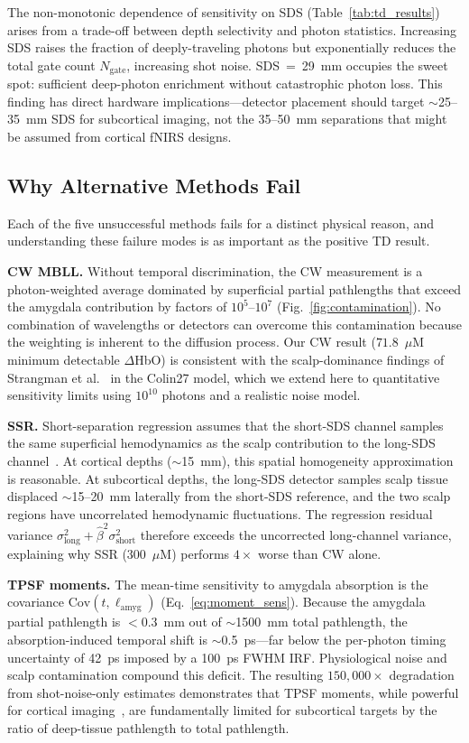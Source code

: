 \documentclass[11pt,a4paper]{article}
\begin{document}
The non-monotonic dependence of sensitivity on SDS (Table~\ref{tab:td_results}) arises from a trade-off between depth selectivity and photon statistics. Increasing SDS raises the fraction of deeply-traveling photons but exponentially reduces the total gate count $N_\mathrm{gate}$, increasing shot noise. SDS~=~29~mm occupies the sweet spot: sufficient deep-photon enrichment without catastrophic photon loss. This finding has direct hardware implications---detector placement should target $\sim$25--35~mm SDS for subcortical imaging, not the 35--50~mm separations that might be assumed from cortical fNIRS designs.

\subsection{Why Alternative Methods Fail}

Each of the five unsuccessful methods fails for a distinct physical reason, and understanding these failure modes is as important as the positive TD result.

\textbf{CW MBLL.} Without temporal discrimination, the CW measurement is a photon-weighted average dominated by superficial partial pathlengths that exceed the amygdala contribution by factors of $10^5$--$10^7$ (Fig.~\ref{fig:contamination}). No combination of wavelengths or detectors can overcome this contamination because the weighting is inherent to the diffusion process. Our CW result ($71.8$~$\mu$M minimum detectable $\Delta$HbO) is consistent with the scalp-dominance findings of Strangman et al.~\cite{strangman2014review} in the Colin27 model, which we extend here to quantitative sensitivity limits using $10^{10}$ photons and a realistic noise model.

\textbf{SSR.} Short-separation regression assumes that the short-SDS channel samples the same superficial hemodynamics as the scalp contribution to the long-SDS channel~\cite{saager2011direct}. At cortical depths ($\sim$15~mm), this spatial homogeneity approximation is reasonable. At subcortical depths, the long-SDS detector samples scalp tissue displaced $\sim$15--20~mm laterally from the short-SDS reference, and the two scalp regions have uncorrelated hemodynamic fluctuations. The regression residual variance $\sigma^2_\mathrm{long} + \hat{\beta}^2\sigma^2_\mathrm{short}$ therefore exceeds the uncorrected long-channel variance, explaining why SSR ($300$~$\mu$M) performs $4\times$ worse than CW alone.

\textbf{TPSF moments.} The mean-time sensitivity to amygdala absorption is the covariance $\mathrm{Cov}(t, \ell_\mathrm{amyg})$ (Eq.~\ref{eq:moment_sens}). Because the amygdala partial pathlength is $<0.3$~mm out of $\sim$1500~mm total pathlength, the absorption-induced temporal shift is $\sim$0.5~ps---far below the per-photon timing uncertainty of 42~ps imposed by a 100~ps FWHM IRF. Physiological noise and scalp contamination compound this deficit. The resulting $150{,}000\times$ degradation from shot-noise-only estimates demonstrates that TPSF moments, while powerful for cortical imaging~\cite{liebert2003monte}, are fundamentally limited for subcortical targets by the ratio of deep-tissue pathlength to total pathlength.
\end{document}
